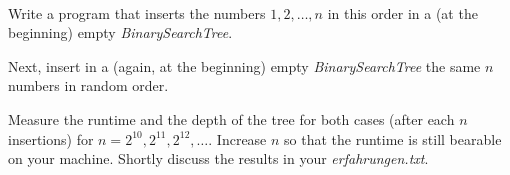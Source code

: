  \\
Write a program that inserts the numbers $1, 2, 
\ldots, n$ in this order in a (at the beginning) empty 
\emph{BinarySearchTree}.

Next, insert in a (again, at the beginning) empty \emph{BinarySearchTree}
the same $n$ numbers in random order.

Measure the runtime and the depth of the tree for both cases (after each $n$ 
insertions) for $n = 2^{10}, 2^{11}, 2^{12},
\ldots$. Increase $n$ so that the runtime is still bearable on your machine. 
Shortly discuss the results in your \emph{erfahrungen.txt}.
